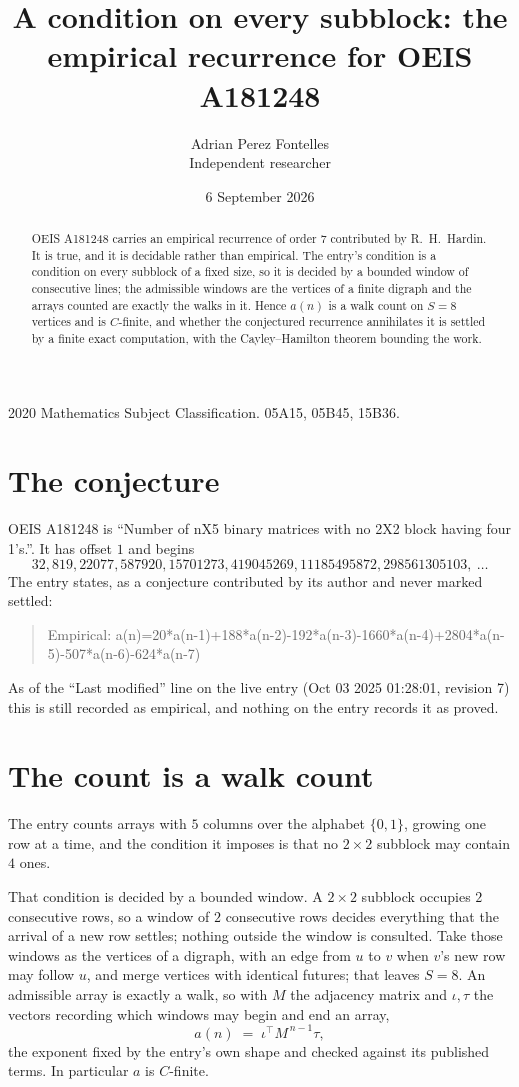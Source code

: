 \documentclass[11pt,a4paper]{article}
\title{A condition on every subblock: the empirical recurrence for OEIS A181248}
\author{Adrian Perez Fontelles\\ \small Independent researcher}
\date{6 September 2026}
\theoremstyle{plain}
\theoremstyle{definition}
\begin{document}
\maketitle

\begin{abstract}
OEIS A181248 carries an empirical recurrence of order $7$ contributed by R.~H.~Hardin. It is
true, and it is decidable rather than empirical. The entry's condition is a condition on every
subblock of a fixed size, so it is decided by a bounded window of consecutive lines; the
admissible windows are the vertices of a finite digraph and the arrays counted are exactly the
walks in it. Hence $a(n)$ is a walk count on $S=8$ vertices and is $C$-finite, and whether the
conjectured recurrence annihilates it is settled by a finite exact computation, with the
Cayley--Hamilton theorem bounding the work.
\end{abstract}

\noindent\small 2020 Mathematics Subject Classification. 05A15, 05B45, 15B36.\normalsize

\section{The conjecture}

OEIS A181248 is ``Number of nX5 binary matrices with no 2X2 block having four 1's.''. It has offset $1$ and begins
\[
32, 819, 22077, 587920, 15701273, 419045269, 11185495872, 298561305103,\ \dots
\]
The entry states, as a conjecture contributed by its author and never marked settled:
\begin{quote}
Empirical: a(n)=20*a(n-1)+188*a(n-2)-192*a(n-3)-1660*a(n-4)+2804*a(n-5)-507*a(n-6)-624*a(n-7)
\end{quote}
As of the ``Last modified'' line on the live entry (Oct 03 2025 01:28:01, revision 7) this is still
recorded as empirical, and nothing on the entry records it as proved.

\section{The count is a walk count}

The entry counts arrays with $5$ columns over the alphabet $\{0,1\}$, growing one row at a time, and the condition it imposes is that no $2\times2$ subblock may contain $4$ ones.

That condition is decided by a bounded window. A $2\times2$ subblock occupies $2$ consecutive rows, so a window of $2$ consecutive rows decides everything that the arrival of a new row settles; nothing outside the window is consulted. Take those windows as the vertices of a digraph, with an edge from $u$ to $v$ when $v$'s new row may follow $u$, and merge vertices with identical futures; that leaves $S=8$. An admissible array is exactly a walk, so with $M$ the adjacency matrix and $\iota,\tau$ the vectors recording which windows may begin and end an array,
\[
a(n)\;=\;\iota^{\!\top}M^{\,n-1}\tau ,
\]
the exponent fixed by the entry's own shape and checked against its published terms. In
particular $a$ is $C$-finite.
\end{document}
